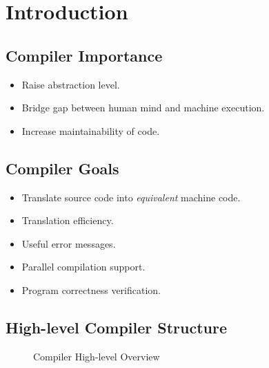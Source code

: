 \section{Introduction}

\subsection{Compiler Importance}
\begin{itemize}
    \item Raise abstraction level.
    \item Bridge gap between human mind and machine execution.
    \item Increase maintainability of code.
\end{itemize}

\subsection{Compiler Goals}
\begin{itemize}
    \item Translate source code into \textit{equivalent} machine code.
    \item Translation efficiency.
    \item Useful error messages.
    \item Parallel compilation support.
    \item Program correctness verification.
\end{itemize}

\subsection{High-level Compiler Structure}
\begin{figure}[H]
    \centering
    \caption{Compiler High-level Overview}
    \label{fig:compiler-high-level-overview}
\end{figure}

